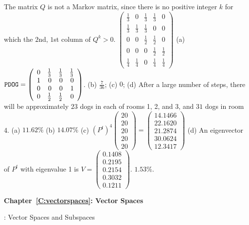  The matrix $Q$ is not a Markov matrix, since there is no
positive integer $k$ for which the $2$nd, $1$st column of $Q^k > 0$.
$\left(\begin{array}{rrrrr}
\frac{1}{3} & 0 & \frac{1}{3} & \frac{1}{3} & 0 \\
\frac{1}{3} & \frac{1}{3} & \frac{1}{3} & 0 & 0 \\
0 & 0 & \frac{1}{2} & \frac{1}{2} & 0 \\
0 & 0 & 0 & \frac{1}{2} & \frac{1}{2} \\
\frac{1}{4} & \frac{1}{4} & 0 & \frac{1}{4} & \frac{1}{4}
\end{array}\right)$
(a) \ans  ${\tt PDOG} = 
\left(\begin{array}{rrrr} 0 & \frac{1}{3} & \frac{1}{3} &
\frac{1}{3} \\ 1 & 0 & 0 & 0 \\ 0 & 0 & 0 & 1 \\
0 & \frac{1}{2} & \frac{1}{2} & 0 \end{array}\right)$.
(b) $\frac{7}{36}$;
(c) \ans  $0$;
(d) \ans After a large number of steps, there will be approximately $23$
dogs in each of rooms 1, 2, and 3, and $31$ dogs in room 4.
(a) $11.62\%$
(b) $14.07\%$
(c) $(P^t)^4\left(\begin{array}{r} 20 \\ 20 \\ 20 \\ 20 \\ 20
\end{array}\right) = \left(\begin{array}{r} 14.1466 \\ 22.1620 \\
21.2874 \\ 30.0624 \\ 12.3417 \end{array}\right)$
(d) \ans An eigenvector of $P^t$ with eigenvalue 1 is
$V = \left(\begin{array}{r} 0.1408 \\ 0.2195 \\ 0.2154 \\ 0.3032
\\ 0.1211 \end{array}\right)$.
\ans $1.53\%$.

\vspace{0.08in}
{\bf Chapter~\ref{C:vectorspaces}: Vector Spaces}

: Vector Spaces and Subspaces

